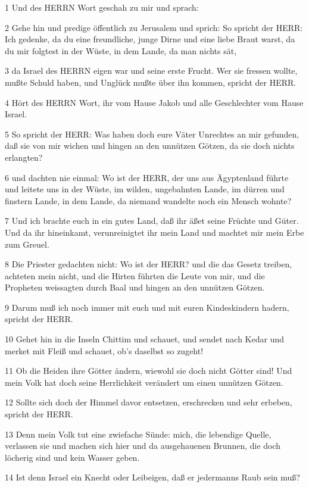 \par 1 Und des HERRN Wort geschah zu mir und sprach:
\par 2 Gehe hin und predige öffentlich zu Jerusalem und sprich: So spricht der HERR: Ich gedenke, da du eine freundliche, junge Dirne und eine liebe Braut warst, da du mir folgtest in der Wüste, in dem Lande, da man nichts sät,
\par 3 da Israel des HERRN eigen war und seine erste Frucht. Wer sie fressen wollte, mußte Schuld haben, und Unglück mußte über ihn kommen, spricht der HERR.
\par 4 Hört des HERRN Wort, ihr vom Hause Jakob und alle Geschlechter vom Hause Israel.
\par 5 So spricht der HERR: Was haben doch eure Väter Unrechtes an mir gefunden, daß sie von mir wichen und hingen an den unnützen Götzen, da sie doch nichts erlangten?
\par 6 und dachten nie einmal: Wo ist der HERR, der uns aus Ägyptenland führte und leitete uns in der Wüste, im wilden, ungebahnten Lande, im dürren und finstern Lande, in dem Lande, da niemand wandelte noch ein Mensch wohnte?
\par 7 Und ich brachte euch in ein gutes Land, daß ihr äßet seine Früchte und Güter. Und da ihr hineinkamt, verunreinigtet ihr mein Land und machtet mir mein Erbe zum Greuel.
\par 8 Die Priester gedachten nicht: Wo ist der HERR? und die das Gesetz treiben, achteten mein nicht, und die Hirten führten die Leute von mir, und die Propheten weissagten durch Baal und hingen an den unnützen Götzen.
\par 9 Darum muß ich noch immer mit euch und mit euren Kindeskindern hadern, spricht der HERR.
\par 10 Gehet hin in die Inseln Chittim und schauet, und sendet nach Kedar und merket mit Fleiß und schauet, ob's daselbst so zugeht!
\par 11 Ob die Heiden ihre Götter ändern, wiewohl sie doch nicht Götter sind! Und mein Volk hat doch seine Herrlichkeit verändert um einen unnützen Götzen.
\par 12 Sollte sich doch der Himmel davor entsetzen, erschrecken und sehr erbeben, spricht der HERR.
\par 13 Denn mein Volk tut eine zwiefache Sünde: mich, die lebendige Quelle, verlassen sie und machen sich hier und da ausgehauenen Brunnen, die doch löcherig sind und kein Wasser geben.
\par 14 Ist denn Israel ein Knecht oder Leibeigen, daß er jedermanns Raub sein muß?

